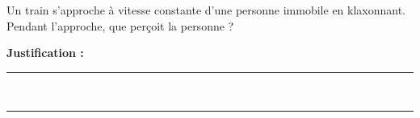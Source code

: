 Un train s'approche à vitesse constante d'une personne immobile en klaxonnant. Pendant l'approche, que perçoit la personne ?

\choices

\noindent\textbf{Justification :} \hrulefill \\[2.5ex]
\rule{\linewidth}{0.4pt} \\[2.5ex]
\rule{\linewidth}{0.4pt}
\vfill
